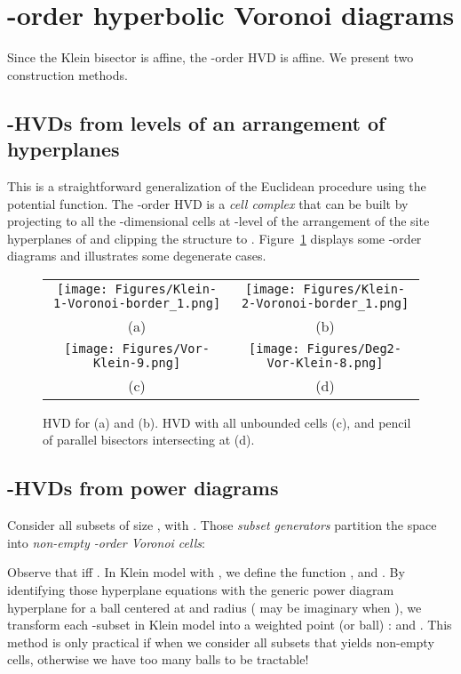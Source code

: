 \documentclass[12pt]{article}
\begin{document}
\section{-order hyperbolic Voronoi diagrams}

Since the Klein bisector is affine, the -order HVD is affine. We present two construction methods.


\subsection{-HVDs from levels of an  arrangement of hyperplanes}
This is a straightforward generalization of the Euclidean procedure using the  potential function.
The -order HVD is a {\em cell complex} that can be built by projecting to  all the -dimensional cells at -level of the arrangement of the site hyperplanes  of   and clipping the structure to .
Figure~\ref{fig:example} displays some -order diagrams and illustrates some degenerate cases.

\def\ttt{0.33\columnwidth}
\begin{figure}\centering
\begin{tabular}{cc}
\texttt{[image: Figures/Klein-1-Voronoi-border\_1.png]} &
\texttt{[image: Figures/Klein-2-Voronoi-border\_1.png]} \\
(a) & (b) \\
\texttt{[image: Figures/Vor-Klein-9.png]} &
\texttt{[image: Figures/Deg2-Vor-Klein-8.png]} \\
(c) & (d)
\end{tabular}
\caption{HVD for  (a) and  (b).
HVD with all unbounded cells (c), and pencil of parallel bisectors intersecting at  (d).
}\label{fig:example}\end{figure}


\subsection{-HVDs from power diagrams}

Consider all subsets of size ,  with .
Those {\em subset generators} partition the space into {\em non-empty -order Voronoi cells}: 


Observe that  iff .
In Klein model with , we define the function , and
.
By identifying those hyperplane equations with the generic power diagram hyperplane  for a ball centered at  and radius  ( may be imaginary when ), we transform each -subset  in Klein model into a weighted point (or ball) :
 and .
This method is only practical if when we consider all subsets  that yields non-empty cells, otherwise we have  too many balls to be tractable!
\end{document}

